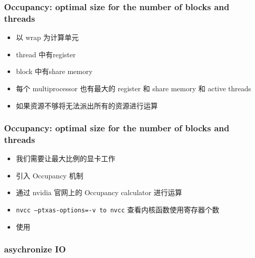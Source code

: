 \begin{frame}
    \frametitle{Occupancy: optimal size for the number of blocks and threads}
    \begin{itemize}
        \item 以 wrap 为计算单元
        \item thread 中有register
        \item block 中有share memory
        \item 每个 multiprocessor 也有最大的 register 和 share memory 和  active threads
        \item 如果资源不够将无法派出所有的资源进行运算
    \end{itemize}
\end{frame}

\begin{frame}
    \frametitle{Occupancy: optimal size for the number of blocks and threads}
    \begin{itemize}
        \item 我们需要让最大比例的显卡工作
        \item 引入 Occupancy 机制
        \item 通过 nvidia 官网上的 Occupancy calculator 进行运算
        \item \texttt{nvcc --ptxas-options=-v to nvcc} 查看内核函数使用寄存器个数
        \item 使用 \texttt{}
    \end{itemize}
\end{frame}


\begin{frame}
    \frametitle{asychronize IO}
\end{frame}